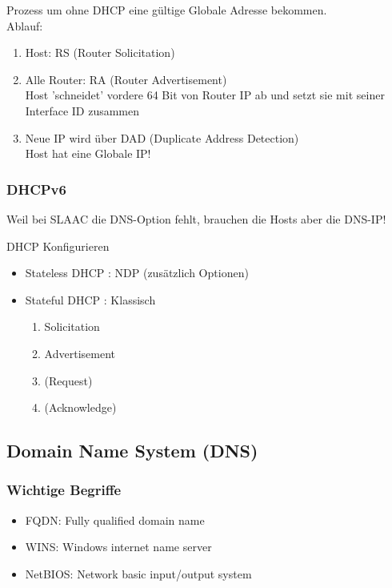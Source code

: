 \documentclass[asp1.tex]{subfiles}
\begin{document}
Prozess um ohne DHCP eine gültige Globale Adresse bekommen.\\
Ablauf:
\begin{enumerate}
    \item Host: RS (Router Solicitation)
    \item Alle Router: RA (Router Advertisement)\\
        \textrightarrow\space Host 'schneidet' vordere 64 Bit von Router IP ab und setzt sie mit seiner Interface ID zusammen
    \item Neue IP wird über DAD (Duplicate Address Detection)\\
    \textrightarrow\space Host hat eine Globale IP!
\end{enumerate}


\subsubsection{DHCPv6}

Weil bei SLAAC die DNS-Option fehlt, brauchen die Hosts aber die DNS-IP!

\textrightarrow\space DHCP Konfigurieren
\begin{itemize}
    \item Stateless DHCP : NDP (zusätzlich Optionen)
    \item Stateful DHCP  : Klassisch
        \begin{enumerate}
            \item Solicitation
            \item Advertisement
            \item (Request)
            \item (Acknowledge)
        \end{enumerate}
\end{itemize}

\subsection{Domain Name System (DNS)}

\subsubsection{Wichtige Begriffe}

\begin{itemize}
    \item FQDN: Fully qualified domain name
    \item WINS: Windows internet name server
    \item NetBIOS: Network basic input/output system
\end{itemize}
\end{document}
